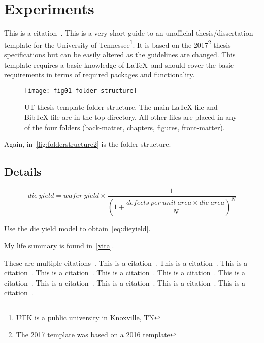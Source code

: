 \chapter{Experiments} \label{chapter2}

This is a citation~\cite{utk:idr2016optimization}.
This is a very short guide to an unofficial thesis/dissertation template
for the University of Tennessee\footnote{UTK is a public university in Knoxville,
TN}.
It is based on the 2017\footnote{The 2017 template was based on a 2016 template} thesis specifications but can be easily altered
as the guidelines are changed.
This template requires a basic knowledge of \LaTeX\ and should cover
the basic requirements in terms of required packages and functionality.

\begin{figure}[H]
    \Centering
    \texttt{[image: fig01-folder-structure]}
    \caption[UT thesis template folder structure]{UT thesis template folder structure.
        The main LaTeX file and BibTeX file are in the top directory.
        All other files are placed in any of the four folders
        (back-matter, chapters, figures, front-matter).}
    \label{fig:folderstructure2}
\end{figure}

Again, in~\autoref{fig:folderstructure2} is the folder structure.

\section{Details} \label{details}

\begin{equation}
    die\ yield = wafer\ yield \times \dfrac{1}{\left(1 + \dfrac{defects\ per\ unit\ area \times die\ area}{N}\right)^N}
    \label{eq:dieyield}
\end{equation}

Use the die yield model to obtain~\autoref{eq:dieyield}.

My life summary is found in~\autoref{vita}.

These are multiple citations~\cite{utk:rdf2018jac,utk:hspwrap2015blast,pupr:plasma2014fpga,ornl:sensorfusion2012}.
This is a citation~\cite{ornl:dmrg2011}.
This is a citation~\cite{caaqa2017appsol}.
This is a citation~\cite{caaqa2017}.
This is a citation~\cite{ornl:poplar2014gateway}.
This is a citation~\cite{utk:hspwrap2014blast}.
This is a citation~\cite{ornl:async2012gpu}.
This is a citation~\cite{ornl:async2011gpu}.
This is a citation~\cite{ornl:dmrg2010}.
This is a citation~\cite{ornl:ipcc2009}.
This is a citation~\cite{utk:idr2015cohpc}.
This is a citation~\cite{pupr:chair2010icste}.
